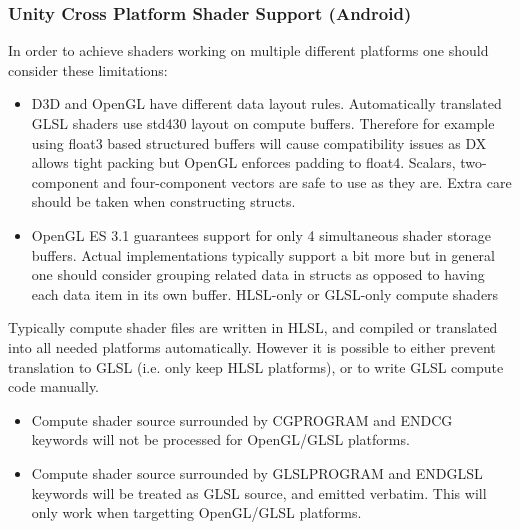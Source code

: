 \documentclass[a4paper,10pt]{article}
\begin{document}
\subsubsection{Unity Cross Platform Shader Support (Android)}
In order to achieve shaders working on multiple different platforms one should consider these limitations:\cite{unityXP}

\begin{itemize}
\item 
D3D and OpenGL have different data layout rules. Automatically translated GLSL shaders use std430 layout on compute buffers. Therefore for example using float3 based structured buffers will cause compatibility issues as DX allows tight packing but OpenGL enforces padding to float4. Scalars, two-component and four-component vectors are safe to use as they are. Extra care should be taken when constructing structs.
\item 
OpenGL ES 3.1 guarantees support for only 4 simultaneous shader storage buffers. Actual implementations typically support a bit more but in general one should consider grouping related data in structs as opposed to having each data item in its own buffer.
HLSL-only or GLSL-only compute shaders

\end{itemize}

Typically compute shader files are written in HLSL, and compiled or translated into all needed platforms automatically. However it is possible to either prevent translation to GLSL (i.e. only keep HLSL platforms), or to write GLSL compute code manually.
\begin{itemize}
\item Compute shader source surrounded by CGPROGRAM and ENDCG keywords will not be processed for OpenGL/GLSL platforms.
\item Compute shader source surrounded by GLSLPROGRAM and ENDGLSL keywords will be treated as GLSL source, and emitted verbatim. This will only work when targetting OpenGL/GLSL platforms.
\end{itemize}
\pagebreak
\end{document}
